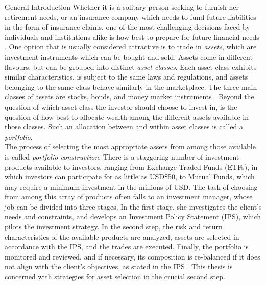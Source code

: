 \begin{section}{General Introduction}\label{sec1}
Whether it is a solitary person seeking to furnish her retirement needs, or an insurance company which needs to fund future liabilities in the form of insurance claims, one of the most challenging decisions faced by individuals and institutions alike is how best to prepare for future financial needs \cite{Conroy2013}. One option that is usually considered attractive is to trade in \textit{assets}, which are investment instruments which can be bought and sold. Assets come in different flavours, but can be grouped into distinct \textit{asset classes}. Each asset class exhibits similar characteristics, is subject to the same laws and regulations, and assets belonging to the same class behave similarly in the marketplace. The three main classes of assets are stocks, bonds, and money market instruments \cite{Investopedia}. Beyond the question of which asset class the investor should choose to invest in, is the question of how best to allocate wealth among the different assets available in those classes. Such an allocation between and within asset classes is called a \textit{portfolio}. \\

The process of selecting the most appropriate assets from among those available is called \textit{portfolio construction}. There is a staggering number of investment products available to investors, ranging from Exchange Traded Funds (ETFs), in which investors can participate for as little as USD\$50, to Mutual Funds, which may require a minimum investment in the millions of USD. The task of choosing from among this array of products often falls to an investment manager, whose job can be divided into three stages. In the first stage, she investigates the client's needs and constraints, and develops an Investment Policy Statement (IPS), which pilots the investment strategy. In the second step, the risk and return characteristics of the available products are analyzed, assets are selected in accordance with the IPS, and the trades are executed. Finally, the portfolio is monitored and reviewed, and if necessary, its composition is re-balanced if it does not align with the client's objectives, as stated in the IPS \cite{Conroy2013}. This thesis is concerned with strategies for asset selection in the crucial second step. \\


\end{section}

